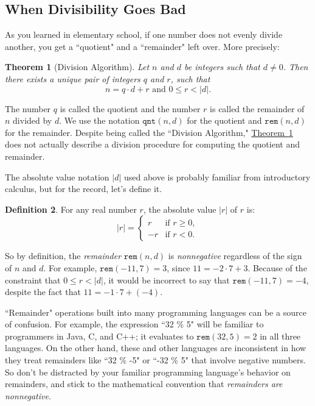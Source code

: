 \documentclass[11pt,oneside]{book}
\newtheorem{thm}{Theorem}[section]
\theoremstyle{definition}
\newtheorem{defn}[thm]{Definition}
\begin{document}
\subsection{When Divisibility Goes Bad}
As you learned in elementary school, if one number does not evenly divide another, you get a ``quotient" and a ``remainder" left over.
More precisely:
\begin{thm}[Division Algorithm] \label{thm:DivisionAlgorithm}
    Let $n$ and $d$ be integers such that $d \neq 0$.
    Then there exists a unique pair of integers $q$ and $r$, such that
    \[ n = q \cdot d + r \text{ and } 0 \leq r < |d|. \]
\end{thm}
The number $q$ is called the quotient and the number $r$ is called the remainder of $n$ divided by $d$.
We use the notation $\texttt{qnt}(n, d)$ for the quotient and $\texttt{rem}(n, d)$ for
the remainder.
Despite being called the ``Division Algorithm," \hyperref[thm:DivisionAlgorithm]{Theorem~\ref*{thm:DivisionAlgorithm}} does not actually describe a division procedure for computing the quotient and remainder.

The absolute value notation $|d|$ used above is probably familiar from introductory calculus, but for the record, let's define it.

\begin{defn}
    For any real number $r$, the absolute value $|r|$ of $r$ is:
    \[ |r| =
    \begin{cases}
        r & \text{if } r \geq 0, \\
        -r & \text{if } r < 0.
    \end{cases} \]
\end{defn}

So by definition, the \emph{remainder} $\texttt{rem}(n, d)$ is \emph{nonnegative} regardless of the sign of $n$ and $d$.
For example, $\texttt{rem}(-11, 7) = 3$, since $11 = -2 \cdot 7 + 3$.
Because of the constraint that $0 \leq r < |d|$, it would be incorrect to say that $\texttt{rem}(-11, 7) = -4$, despite the fact that $11 = -1 \cdot 7 + (-4)$.

``Remainder" operations built into many programming languages can be a source of confusion.
For example, the expression ``32 \% 5" will be familiar to programmers in Java, C, and C++; it evaluates to $\texttt{rem}(32, 5) = 2$ in all three languages.
On the other hand, these and other languages are inconsistent in how they treat remainders like ``32 \% -5" or ``-32 \% 5" that involve negative numbers.
So don't be distracted by your familiar programming language's behavior on remainders, and stick to the mathematical convention that \emph{remainders are nonnegative}.
\end{document}
